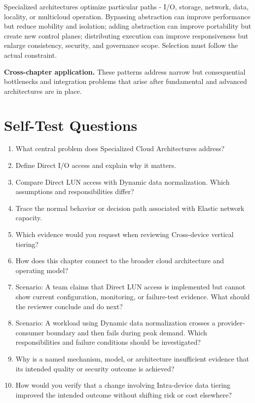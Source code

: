 \documentclass[11pt]{article}
\begin{document}
\begin{synthesisbox}
Specialized architectures optimize particular paths - I/O, storage, network, data, locality, or multicloud operation. Bypassing abstraction can improve performance but reduce mobility and isolation; adding abstraction can improve portability but create new control planes; distributing execution can improve responsiveness but enlarge consistency, security, and governance scope. Selection must follow the actual constraint.
\par\smallskip
\textbf{Cross-chapter application.} These patterns address narrow but consequential bottlenecks and integration problems that arise after fundamental and advanced architectures are in place.
\end{synthesisbox}
\section{Self-Test Questions}
\begin{enumerate}
\item What central problem does Specialized Cloud Architectures address?
\item Define Direct I/O access and explain why it matters.
\item Compare Direct LUN access with Dynamic data normalization. Which assumptions and responsibilities differ?
\item Trace the normal behavior or decision path associated with Elastic network capacity.
\item Which evidence would you request when reviewing Cross-device vertical tiering?
\item How does this chapter connect to the broader cloud architecture and operating model?
\item Scenario: A team claims that Direct LUN access is implemented but cannot show current configuration, monitoring, or failure-test evidence. What should the reviewer conclude and do next?
\item Scenario: A workload using Dynamic data normalization crosses a provider-consumer boundary and then fails during peak demand. Which responsibilities and failure conditions should be investigated?
\item Why is a named mechanism, model, or architecture insufficient evidence that its intended quality or security outcome is achieved?
\item How would you verify that a change involving Intra-device data tiering improved the intended outcome without shifting risk or cost elsewhere?
\end{enumerate}
\clearpage
\end{document}
